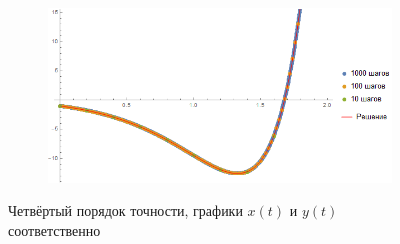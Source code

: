 \documentclass[a4paper,12pt,titlepage,finall]{article}
\begin{document}
\begin{enumerate}
\begin{figure}[h]
\begin{subfigure}{.5\textwidth}
\end{subfigure}%
\begin{subfigure}{.5\textwidth}
  \centering
  \includegraphics[width=\textwidth]{test_1_6_4_y.png}
\end{subfigure}
\caption{Четвёртый порядок точности, графики $x(t)$ и $y(t)$ соответственно}
\end{figure}


\end{enumerate}
\end{document}
